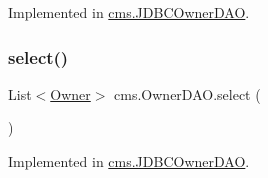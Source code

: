 Implemented in \mbox{\hyperlink{classcms_1_1_j_d_b_c_owner_d_a_o_ad0540f3f132d78562a11afe2bf30cd29}{cms.\+J\+D\+B\+C\+Owner\+D\+AO}}.

\mbox{\label{interfacecms_1_1_owner_d_a_o_a51c6035e79a08ba4bf4396175e841133}} 
\subsubsection{\texorpdfstring{select()}{select()}}
{\footnotesize\ttfamily List$<$\mbox{\hyperlink{classcms_1_1_owner}{Owner}}$>$ cms.\+Owner\+D\+A\+O.\+select (\begin{DoxyParamCaption}{ }\end{DoxyParamCaption})}



Implemented in \mbox{\hyperlink{classcms_1_1_j_d_b_c_owner_d_a_o_a81952fce2cc39e648eb048d76bfb048d}{cms.\+J\+D\+B\+C\+Owner\+D\+AO}}.

